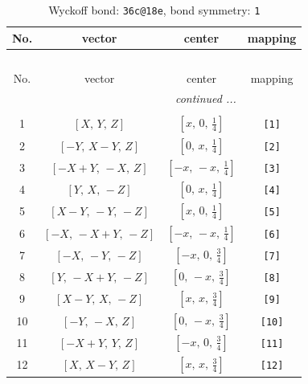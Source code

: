 \documentclass[fleqn,8pt]{jsarticle}
\begin{document}
\begin{longtable}{cccc}
\caption{Wyckoff bond: {\tt 36c@18e}, bond symmetry: {\tt 1}}
 \\
 \hline \hline
No. & vector & center & mapping \\ \hline \endfirsthead

\multicolumn{3}{l}{\tablename\ \thetable{}} \\
 \hline \hline
No. & vector & center & mapping \\ \hline \endhead

 \hline \hline
\multicolumn{3}{r}{\footnotesize\it continued ...} \\ \endfoot

 \hline \hline
\multicolumn{3}{r}{} \\ \endlastfoot

1 & $\left[ X,\, Y,\, Z \right]$ & $\left[ x,\, 0,\, \frac{1}{4} \right]$ & {\tt [1]} \\ \hline
2 & $\left[ - Y,\, X - Y,\, Z \right]$ & $\left[ 0,\, x,\, \frac{1}{4} \right]$ & {\tt [2]} \\ \hline
3 & $\left[ - X + Y,\, - X,\, Z \right]$ & $\left[ - x,\, - x,\, \frac{1}{4} \right]$ & {\tt [3]} \\ \hline
4 & $\left[ Y,\, X,\, - Z \right]$ & $\left[ 0,\, x,\, \frac{1}{4} \right]$ & {\tt [4]} \\ \hline
5 & $\left[ X - Y,\, - Y,\, - Z \right]$ & $\left[ x,\, 0,\, \frac{1}{4} \right]$ & {\tt [5]} \\ \hline
6 & $\left[ - X,\, - X + Y,\, - Z \right]$ & $\left[ - x,\, - x,\, \frac{1}{4} \right]$ & {\tt [6]} \\ \hline
7 & $\left[ - X,\, - Y,\, - Z \right]$ & $\left[ - x,\, 0,\, \frac{3}{4} \right]$ & {\tt [7]} \\ \hline
8 & $\left[ Y,\, - X + Y,\, - Z \right]$ & $\left[ 0,\, - x,\, \frac{3}{4} \right]$ & {\tt [8]} \\ \hline
9 & $\left[ X - Y,\, X,\, - Z \right]$ & $\left[ x,\, x,\, \frac{3}{4} \right]$ & {\tt [9]} \\ \hline
10 & $\left[ - Y,\, - X,\, Z \right]$ & $\left[ 0,\, - x,\, \frac{3}{4} \right]$ & {\tt [10]} \\ \hline
11 & $\left[ - X + Y,\, Y,\, Z \right]$ & $\left[ - x,\, 0,\, \frac{3}{4} \right]$ & {\tt [11]} \\ \hline
12 & $\left[ X,\, X - Y,\, Z \right]$ & $\left[ x,\, x,\, \frac{3}{4} \right]$ & {\tt [12]} \\
\end{longtable}
\end{document}
